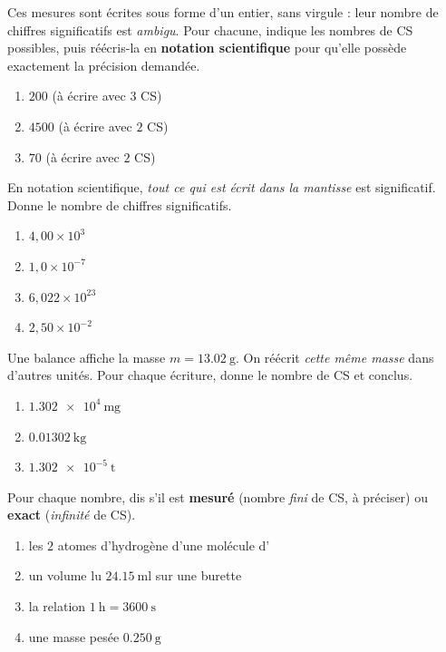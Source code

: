 \documentclass[11pt,a4paper]{article}
\begin{document}
\begin{exo}
Ces mesures sont écrites sous forme d'un entier, sans virgule : leur nombre de chiffres significatifs
est \emph{ambigu}. Pour chacune, indique les nombres de CS possibles, puis réécris-la en
\textbf{notation scientifique} pour qu'elle possède exactement la précision demandée.
\begin{enumerate}[label=\alph*)]
  \item $200$ \quad (à écrire avec $3$ CS)
  \item $4500$ \quad (à écrire avec $2$ CS)
  \item $70$ \quad (à écrire avec $2$ CS)
\end{enumerate}
\end{exo}

\begin{exo}
En notation scientifique, \emph{tout ce qui est écrit dans la mantisse} est significatif. Donne le
nombre de chiffres significatifs.
\begin{enumerate}[label=\alph*)]
  \item $4,00\times10^{3}$
  \item $1,0\times10^{-7}$
  \item $6,022\times10^{23}$
  \item $2,50\times10^{-2}$
\end{enumerate}
\end{exo}

\begin{exo}
Une balance affiche la masse $m=\qty{13,02}{\gram}$. On réécrit \emph{cette même masse} dans d'autres
unités. Pour chaque écriture, donne le nombre de CS et conclus.
\begin{enumerate}[label=\alph*)]
  \item $\num{1,302e4}\ \si{\milli\gram}$
  \item $\qty{0,01302}{\kilo\gram}$
  \item $\num{1,302e-5}\ \si{\tonne}$
\end{enumerate}
\end{exo}

\begin{exo}
Pour chaque nombre, dis s'il est \textbf{mesuré} (nombre \emph{fini} de CS, à préciser) ou
\textbf{exact} (\emph{infinité} de CS).
\begin{enumerate}[label=\alph*)]
  \item les $2$ atomes d'hydrogène d'une molécule d'
  \item un volume lu $\qty{24,15}{\milli\litre}$ sur une burette
  \item la relation $\qty{1}{\hour}=\qty{3600}{\second}$
  \item une masse pesée $\qty{0,250}{\gram}$
\end{enumerate}
\end{exo}
\end{document}
